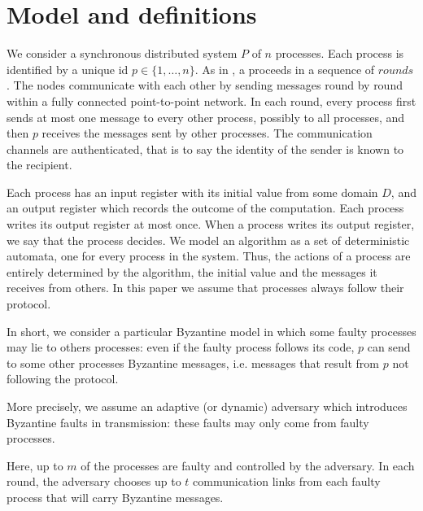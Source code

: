 \section{Model and definitions}
 
We consider a synchronous distributed system $P$ of $n$ processes. 
Each process is
identified by a unique id $p \in \{ 1, \ldots ,n \}$.  
As in {\cite{lamport1982byzantine,toueg1984simple}}, a
{} proceeds in a sequence of $rounds$.    
 The nodes communicate
with each other by sending messages round by round within a fully
connected 
point-to-point network.
In each round, every process first sends at most one message to every other process, possibly to all processes, 
and then $p$ receives the messages sent
by other  processes. The communication channels are authenticated,
that is to say the identity of the sender is known to the recipient. 

Each process has
an input register with its initial value from some domain $D$, and an
output register  
which records the outcome of the computation.
Each process writes its output register at most once. When a
process writes its output register, we say that the process decides.
We model an algorithm as a set of deterministic automata, one for
every process in the system. 
Thus, the actions of a process are entirely determined by the
algorithm, the initial value and the messages it receives from others. 
In this paper we assume that processes always follow their protocol.


\vspace{1em}
In short, we consider a particular Byzantine model in which some faulty processes
may lie to others processes: even if the faulty process
follows its code, $p$ can send to some other processes Byzantine
messages, i.e. messages that result from $p$ not following the protocol.

More precisely, we assume an adaptive (or dynamic) adversary
which introduces Byzantine faults in transmission: these faults may
only come from faulty processes.

Here, up to $m$ of the
processes are 
faulty and controlled by the adversary. In each round, the adversary chooses
up to $t$ communication links from each faulty process that
will carry Byzantine messages. 


